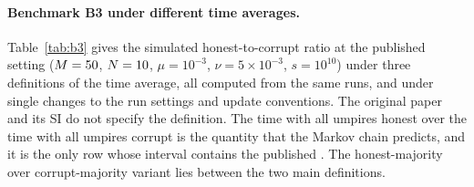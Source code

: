 \documentclass[journal]{IEEEtran}
\begin{document}
\paragraph{Benchmark B3 under different time averages.} Table~\ref{tab:b3} gives the simulated
honest-to-corrupt ratio at the published setting ($M=50$, $N=10$, $\mu=10^{-3}$,
$\nu=5\times10^{-3}$, $s=10^{10}$) under three definitions of the time average, all computed from
the same \Nreps{} runs, and under single changes to the run settings and update conventions. The
original paper and its SI do not specify the definition. The time with all umpires honest over
the time with all umpires corrupt is the quantity that the Markov chain predicts, and it is the
only row whose interval contains the published \PaperRatio. The honest-majority over
corrupt-majority variant lies between the two main definitions.
\end{document}
